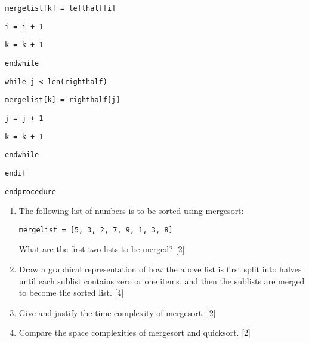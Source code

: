 \begin{minipage}[t]{1\columnwidth}
\texttt{\qquad{}\qquad{}\qquad{}mergelist{[}k{]} = lefthalf{[}i{]}}

\texttt{\qquad{}\qquad{}\qquad{}i = i + 1}

\texttt{\qquad{}\qquad{}\qquad{}k = k + 1 }

\texttt{\qquad{}\qquad{}endwhile}

\texttt{\qquad{}\qquad{}while j < len(righthalf)}

\texttt{\qquad{}\qquad{}\qquad{}mergelist{[}k{]} = righthalf{[}j{]}}

\texttt{\qquad{}\qquad{}\qquad{}j = j + 1}

\texttt{\qquad{}\qquad{}\qquad{}k = k + 1 }

\texttt{\qquad{}\qquad{}endwhile}

\texttt{\qquad{}endif }

\texttt{endprocedure}%
\end{minipage}
\begin{enumerate}
\item The following list of numbers is to be sorted using mergesort:

\texttt{mergelist = {[}5, 3, 2, 7, 9, 1, 3, 8{]}}

What are the first two lists to be merged? \hfill{}{[}2{]}
\item Draw a graphical representation of how the above list is first split
into halves until each sublist contains zero or one items, and then
the sublists are merged to become the sorted list. \hfill{}{[}4{]}
\item Give and justify the time complexity of mergesort. \hfill{}{[}2{]}
\item Compare the space complexities of mergesort and quicksort.\hfill{}
{[}2{]}
\end{enumerate}